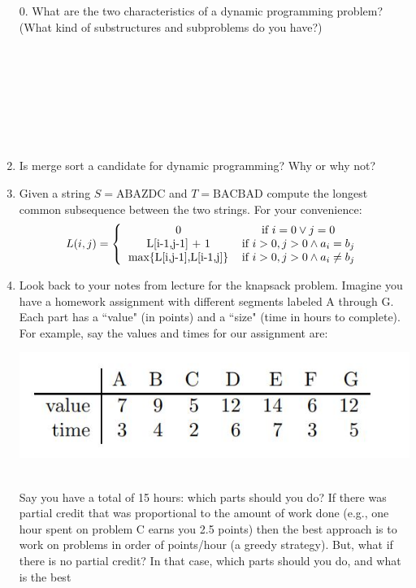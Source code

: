 \documentclass[12pt]{article}
\begin{document}
\begin{enumerate}
\item[0.] What are the two characteristics of a dynamic programming problem? (What kind of substructures and subproblems do you have?)\\\\\\\\\\\\\\\\
\item Is merge sort a candidate for dynamic programming? Why or why not? 
\newpage
\item Given a string $S=\text{ABAZDC}$ and $T=\text{BACBAD}$ compute the longest common subsequence between the two strings. For your convenience:\\
\[
L(i,j) = \left\{
\begin{tabular}{cc}
0 & \text{if} $i = 0 \lor j = 0$ \\
L[i-1,j-1] + 1 & \text{if} $i > 0, j > 0 \land a_i = b_j$  \\
max\{L[i,j-1],L[i-1,j]\} & \text{if} $i > 0, j > 0 \land a_i \ne b_j$   \\
\end{tabular}\right.
\]
\newpage
\item Look back to your notes from lecture for the knapsack problem. Imagine you have a homework assignment 
with different segments labeled A through G. Each part has a ``value" (in points) and a ``size" (time in hours to complete). 
For example, say the values and times for our assignment are: \\
\centerline{\includegraphics[scale = 0.8]{ks.jpg}}\\
Say you have a total of 15 hours: which parts should you do? If there was partial credit that was
proportional to the amount of work done (e.g., one hour spent on problem C earns you 2.5 points)
then the best approach is to work on problems in order of points/hour (a greedy strategy). But,
what if there is no partial credit? In that case, which parts should you do, and what is the best

\end{enumerate}
\end{document}
